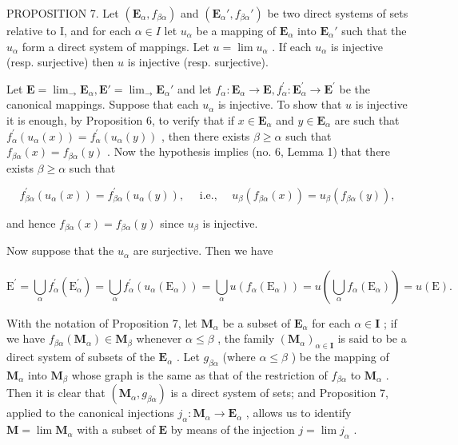 PROPOSITION 7. Let \((\mathbf{E}_{\alpha}, f_{\beta \alpha})\) and \((\mathbf{E}_{\alpha}', f_{\beta \alpha}')\) be two direct systems of sets relative to I, and for each \(\alpha \in I\) let \(u_{\alpha}\) be a mapping of \(\mathbf{E}_{\alpha}\) into \(\mathbf{E}_{\alpha}'\) such that the \(u_{\alpha}\) form a direct system of mappings. Let \(u = \lim u_{\alpha}\) . If each \(u_{\alpha}\) is injective (resp. surjective) then \(u\) is injective (resp. surjective).

Let \(\mathbf{E} = \lim_{\rightarrow}\mathbf{E}_{\alpha},\mathbf{E}' = \lim_{\rightarrow}\mathbf{E}_{\alpha}'\) and let \(f_{\alpha}\colon \mathbf{E}_{\alpha}\to \mathbf{E},f_{\alpha}^{\prime}\colon \mathbf{E}_{\alpha}^{\prime}\to \mathbf{E}^{\prime}\) be the canonical mappings. Suppose that each \(u_{\alpha}\) is injective. To show that \(u\) is injective it is enough, by Proposition 6, to verify that if \(x\in \mathbf{E}_{\alpha}\) and \(y\in \mathbf{E}_{\alpha}\) are such that \(f_{\alpha}^{\prime}(u_{\alpha}(x)) = f_{\alpha}^{\prime}(u_{\alpha}(y))\) , then there exists \(\beta \geqslant \alpha\) such that \(f_{\beta \alpha}(x) = f_{\beta \alpha}(y)\) . Now the hypothesis implies (no. 6, Lemma 1) that there exists \(\beta \geqslant \alpha\) such that

\[
f _ {\beta \alpha} ^ {\prime} (u _ {\alpha} (x)) = f _ {\beta \alpha} ^ {\prime} (u _ {\alpha} (y)), \quad \text { i.e., } \quad u _ {\beta} (f _ {\beta \alpha} (x)) = u _ {\beta} (f _ {\beta \alpha} (y)),
\]

and hence \(f_{\beta \alpha}(x) = f_{\beta \alpha}(y)\) since \(u_{\beta}\) is injective.

Now suppose that the \(u_{\alpha}\) are surjective. Then we have

\[
\mathrm{E} ^ {\prime} = \bigcup_ {\alpha} f _ {\alpha} ^ {\prime} (\mathrm{E} _ {\alpha} ^ {\prime}) = \bigcup_ {\alpha} f _ {\alpha} ^ {\prime} (u _ {\alpha} (\mathrm{E} _ {\alpha})) = \bigcup_ {\alpha} u (f _ {\alpha} (\mathrm{E} _ {\alpha})) = u \left(\bigcup_ {\alpha} f _ {\alpha} (\mathrm{E} _ {\alpha})\right) = u (\mathrm{E}).
\]

With the notation of Proposition 7, let \(\mathbf{M}_{\alpha}\) be a subset of \(\mathbf{E}_{\alpha}\) for each \(\alpha \in \mathbf{I}\) ; if we have \(f_{\beta \alpha}(\mathbf{M}_{\alpha}) \in \mathbf{M}_{\beta}\) whenever \(\alpha \leqslant \beta\) , the family \((\mathbf{M}_{\alpha})_{\alpha \in \mathbf{I}}\) is said to be a direct system of subsets of the \(\mathbf{E}_{\alpha}\) . Let \(g_{\beta \alpha}\) (where \(\alpha \leqslant \beta\) ) be the mapping of \(\mathbf{M}_{\alpha}\) into \(\mathbf{M}_{\beta}\) whose graph is the same as that of the restriction of \(f_{\beta \alpha}\) to \(\mathbf{M}_{\alpha}\) . Then it is clear that \((\mathbf{M}_{\alpha}, g_{\beta \alpha})\) is a direct system of sets; and Proposition 7, applied to the canonical injections \(j_{\alpha}: \mathbf{M}_{\alpha} \to \mathbf{E}_{\alpha}\) , allows us to identify \(\mathbf{M} = \lim \mathbf{M}_{\alpha}\) with a subset of \(\mathbf{E}\) by means of the injection \(j = \lim j_{\alpha}\) .


